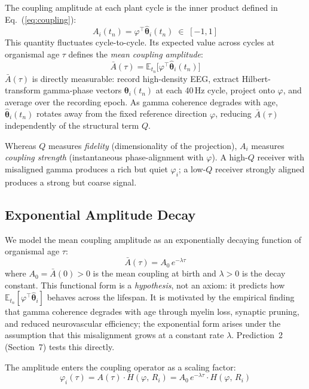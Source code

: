 \documentclass[12pt]{article}
\begin{document}
The coupling amplitude at each plant cycle is the inner product defined in Eq.~(\ref{eq:coupling}):
\begin{equation}
    A_i(t_n) = \varphi^\top\hat{\boldsymbol{\theta}}_i(t_n) \;\in\; [-1,1]
\end{equation}
This quantity fluctuates cycle-to-cycle. Its expected value across cycles at organismal age $\tau$ defines the \emph{mean coupling amplitude}:
\begin{equation}
    \bar{A}(\tau) = \mathbb{E}_{t_n}\!\bigl[\varphi^\top\hat{\boldsymbol{\theta}}_i(t_n)\bigr]
\end{equation}
$\bar{A}(\tau)$ is directly measurable: record high-density EEG, extract Hilbert-transform gamma-phase vectors $\boldsymbol{\theta}_i(t_n)$ at each 40\,Hz cycle, project onto $\varphi$, and average over the recording epoch. As gamma coherence degrades with age, $\hat{\boldsymbol{\theta}}_i(t_n)$ rotates away from the fixed reference direction $\varphi$, reducing $\bar{A}(\tau)$ independently of the structural term $Q$.

Whereas $Q$ measures \emph{fidelity} (dimensionality of the projection), $A_i$ measures \emph{coupling strength} (instantaneous phase-alignment with $\varphi$). A high-$Q$ receiver with misaligned gamma produces a rich but quiet $\varphi_i$; a low-$Q$ receiver strongly aligned produces a strong but coarse signal.

\subsection{Exponential Amplitude Decay}

We model the mean coupling amplitude as an exponentially decaying function of organismal age $\tau$:
\begin{equation}
    \bar{A}(\tau) = A_0\, e^{-\lambda \tau}
\end{equation}
where $A_0 = \bar{A}(0) > 0$ is the mean coupling at birth and $\lambda > 0$ is the decay constant. This functional form is a \emph{hypothesis}, not an axiom: it predicts how $\mathbb{E}_{t_n}[\varphi^\top\hat{\boldsymbol{\theta}}_i]$ behaves across the lifespan. It is motivated by the empirical finding that gamma coherence degrades with age through myelin loss, synaptic pruning, and reduced neurovascular efficiency; the exponential form arises under the assumption that this misalignment grows at a constant rate $\lambda$. Prediction~2 (Section~7) tests this directly.

The amplitude enters the coupling operator as a scaling factor:
\begin{equation}
    \varphi_i(\tau) = A(\tau)\cdot H(\varphi,\, R_i)
    = A_0\, e^{-\lambda \tau} \cdot H(\varphi,\, R_i)
\end{equation}
\end{document}
